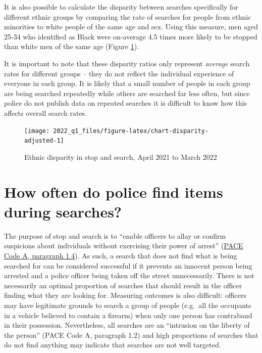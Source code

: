 \documentclass[
  a4paper,
  twoside, 11pt]{article}
\begin{document}
It is also possible to calculate the disparity between searches specifically for different ethnic groups by comparing the rate of searches for people from ethnic minorities to white people of the same age and sex. Using this measure, men aged 25-34 who identified as Black were on-average 4.5 times more likely to be stopped than white men of the same age (Figure \ref{fig:chart-disparity-adjusted}).

It is important to note that these disparity ratios only represent \emph{average} search rates for different groups -- they do not reflect the individual experience of everyone in each group. It is likely that a small number of people in each group are being searched repeatedly while others are searched far less often, but since police do not publish data on repeated searches it is difficult to know how this affects overall search rates.



\begin{figure}[tb]

{\centering \texttt{[image: 2022\_q1\_files/figure-latex/chart-disparity-adjusted-1]} 

}

\caption{Ethnic disparity in stop and search, April 2021 to March 2022}\label{fig:chart-disparity-adjusted}
\end{figure}

\hypertarget{how-often-do-police-find-items-during-searches}{%
\section{How often do police find items during searches?}\label{how-often-do-police-find-items-during-searches}}

The purpose of stop and search is to ``enable officers to allay or confirm suspicions about individuals without exercising their power of arrest'' (\href{https://www.gov.uk/guidance/police-and-criminal-evidence-act-1984-pace-codes-of-practice}{PACE Code A, paragraph 1.4}). As such, a search that does not find what is being searched for can be considered successful if it prevents an innocent person being arrested and a police officer being taken off the street unnecessarily. There is not necessarily an optimal proportion of searches that should result in the officer finding what they are looking for. Measuring outcomes is also difficult: officers may have legitimate grounds to search a group of people (e.g.~all the occupants in a vehicle believed to contain a firearm) when only one person has contraband in their possession. Nevertheless, all searches are an ``intrusion on the liberty of the person'' (PACE Code A, paragraph 1.2) and high proportions of searches that do not find anything may indicate that searches are not well targeted.
\end{document}

